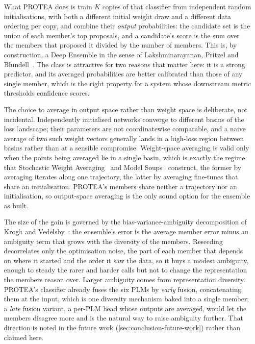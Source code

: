 What PROTEA does is train $K$ copies of that classifier from independent random
initialisations, with both a different initial weight draw and a different data
ordering per copy, and combine their \emph{output} probabilities: the candidate
set is the union of each member's top proposals, and a candidate's score is the
sum over the members that proposed it divided by the number of members. This is,
by construction, a Deep Ensemble in the sense of
Lakshminarayanan, Pritzel and Blundell~\cite{lakshminarayanan2017deepensembles}.
The class is attractive for two reasons that matter here: it is a strong
predictor, and its averaged probabilities are better calibrated than those of any
single member, which is the right property for a system whose downstream metric
thresholds confidence scores.

The choice to average in output space rather than weight space is deliberate, not
incidental. Independently initialised networks converge to different basins of
the loss landscape; their parameters are not coordinatewise comparable, and a
naive average of two such weight vectors generally lands in a high-loss region
between basins rather than at a sensible compromise. Weight-space averaging is
valid only when the points being averaged lie in a single basin, which is exactly
the regime that Stochastic Weight Averaging~\cite{izmailov2018swa} and Model
Soups~\cite{wortsman2022modelsoups} construct, the former by averaging iterates
along one trajectory, the latter by averaging fine-tunes that share an
initialisation. PROTEA's members share neither a trajectory nor an
initialisation, so output-space averaging is the only sound option for the
ensemble as built.

The size of the gain is governed by the bias-variance-ambiguity decomposition of
Krogh and Vedelsby~\cite{krogh1995ambiguity}: the ensemble's error is the average
member error minus an ambiguity term that grows with the diversity of the
members. Reseeding decorrelates only the optimisation noise, the part of each
member that depends on where it started and the order it saw the data, so it buys
a modest ambiguity, enough to steady the rarer and harder calls but not to change
the representation the members reason over. Larger ambiguity comes from
representation diversity. PROTEA's classifier already fuses the six PLMs by
\emph{early} fusion, concatenating them at the input, which is one diversity
mechanism baked into a single member; a \emph{late} fusion variant, a per-PLM
head whose outputs are averaged, would let the members disagree more and is the
natural way to raise ambiguity further. That direction is noted in the future
work (\cref{sec:conclusion-future-work}) rather than claimed here.

